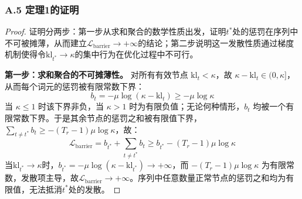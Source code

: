 \documentclass[lettersize,journal]{IEEEtran}
\begin{document}
\subsubsection*{A.5 定理1的证明}\label{app:barrier}
\begin{proof}
证明分两步：第一步从求和聚合的数学性质出发，证明$t^*$处的惩罚在序列中不可被摊薄，从而建立$\mathcal{L}_{\text{barrier}} \to +\infty$的结论；第二步说明这一发散性质通过梯度机制使得令$\mathrm{kl}_{t^*} \to \kappa$的集中行为在优化过程中不可行。

\textbf{第一步：求和聚合的不可摊薄性。}
对所有有效节点 $\mathrm{kl}_t < \kappa$，故 $\kappa - \mathrm{kl}_t \in (0, \kappa]$，从而每个词元的惩罚被有限常数下界：
\begin{equation}
    b_t = -\mu\log(\kappa - \mathrm{kl}_t) \geq -\mu\log\kappa
\end{equation}
当 $\kappa \leq 1$ 时该下界非负，当 $\kappa > 1$ 时为有限负值；无论何种情形，$b_t$ 均被一个有限常数下界。于是其余节点的惩罚之和被有限值下界，$\sum_{t \neq t^*} b_t \geq -(T_r - 1)\mu\log\kappa$，故：
\begin{equation}
    \mathcal{L}_{\text{barrier}} = b_{t^*} + \sum_{t \neq t^*} b_t 
    \geq b_{t^*} - (T_r - 1)\mu\log\kappa
\end{equation}
当$\mathrm{kl}_{t^*} \to \kappa$时，$b_{t^*} = -\mu\log(\kappa - \mathrm{kl}_{t^*}) \to +\infty$，而 $-(T_r - 1)\mu\log\kappa$ 为有限常数，发散项主导，故$\mathcal{L}_{\text{barrier}} \to +\infty$。序列中任意数量正常节点的惩罚之和均为有限值，无法抵消$t^*$处的发散。


\end{proof}
\end{document}
